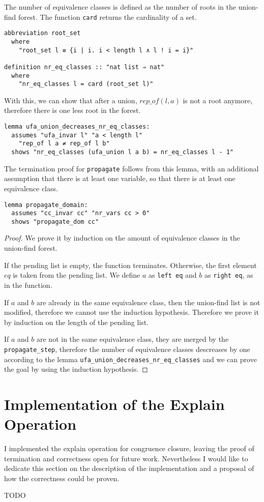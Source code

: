 The number of equivalence classes is defined as the number of roots in the union-find forest. The function \lstinline|card| returns the cardinality of a set.

\begin{lstlisting}
abbreviation root_set
  where
    "root_set l ≡ {i | i. i < length l ∧ l ! i = i}"

definition nr_eq_classes :: "nat list ⇒ nat"
  where
    "nr_eq_classes l = card (root_set l)"
\end{lstlisting}

With this, we can show that after a union, $rep\_of (l, a)$ is not a root anymore, therefore there is one less root in the forest.

\begin{lstlisting}
lemma ufa_union_decreases_nr_eq_classes:
  assumes "ufa_invar l" "a < length l"
    "rep_of l a ≠ rep_of l b"
  shows "nr_eq_classes (ufa_union l a b) = nr_eq_classes l - 1"
\end{lstlisting}

The termination proof for \lstinline{propagate} follows from this lemma, with an additional assumption that there is at least one variable, so that there is at least one equivalence class.

\begin{lstlisting}
lemma propagate_domain:
  assumes "cc_invar cc" "nr_vars cc > 0"
  shows "propagate_dom cc"
\end{lstlisting}

\begin{proof}
We prove it by induction on the amount of equivalence classes in the union-find forest.

If the pending list is empty, the function terminates. Otherwise, the first element $eq$ is taken from the pending list. We define $a$ as \lstinline{left eq} and $b$ as \lstinline{right eq}, as in the function.

If $a$ and $b$ are already in the same equivalence class, then the union-find list is not modified, therefore we cannot use the induction hypothesis. Therefore we prove it by induction on the length of the pending list.

If $a$ and $b$ are not in the same equivalence class, they are merged by the \lstinline{propagate_step}, therefore the number of equivalence classes descreases by one according to the lemma \lstinline{ufa_union_decreases_nr_eq_classes} and we can prove the goal by using the induction hypothesis.
\end{proof}

\section{Implementation of the Explain Operation}

I implemented the explain operation for congruence closure, leaving the proof of termination and correctness open for future work. Nevertheless I would like to dedicate this section on the description of the implementation and a proposal of how the correctness could be proven.

TODO